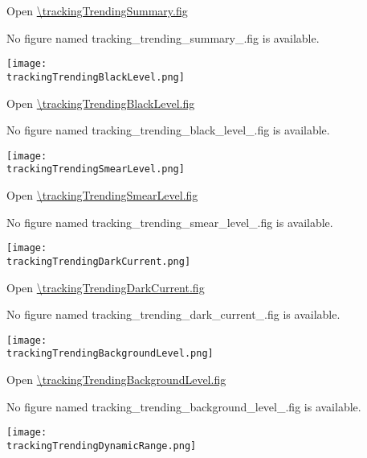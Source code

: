 Open \url{\trackingTrendingSummary.fig}

\else
No figure named tracking\_trending\_summary\_\channelSuffix.fig is
available.
\fi

\ifdefined \trackingTrendingBlackLevel

\begin{center}
  \texttt{[image: \\trackingTrendingBlackLevel.png]}
\end{center}

Open \url{\trackingTrendingBlackLevel.fig}

\else
No figure named tracking\_trending\_black\_level\_\channelSuffix.fig
is available.
\fi

\vspace{5ex}

\ifdefined \trackingTrendingSmearLevel

\begin{center}
  \texttt{[image: \\trackingTrendingSmearLevel.png]}
\end{center}

Open \url{\trackingTrendingSmearLevel.fig}

\else
No figure named tracking\_trending\_smear\_level\_\channelSuffix.fig
is available.
\fi

\ifdefined \trackingTrendingDarkCurrent

\begin{center}
  \texttt{[image: \\trackingTrendingDarkCurrent.png]}
\end{center}

Open \url{\trackingTrendingDarkCurrent.fig}

\else
No figure named tracking\_trending\_dark\_current\_\channelSuffix.fig
is available.
\fi

\vspace{5ex}

\ifdefined \trackingTrendingBackgroundLevel

\begin{center}
  \texttt{[image: \\trackingTrendingBackgroundLevel.png]}
\end{center}

Open \url{\trackingTrendingBackgroundLevel.fig}

\else
No figure named
tracking\_trending\_background\_level\_\channelSuffix.fig is
available.
\fi

\ifdefined \trackingTrendingDynamicRange

\begin{center}
  \texttt{[image: \\trackingTrendingDynamicRange.png]}
\end{center}

